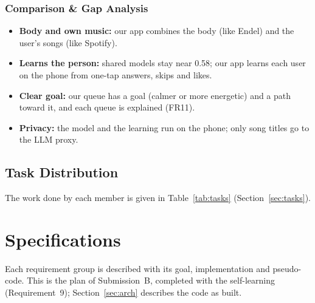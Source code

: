 \documentclass[conference]{IEEEtran}
\begin{document}
\subsubsection{Comparison \& Gap Analysis}
\begin{itemize}
\item \textbf{Body and own music:} our app combines the body (like Endel) and the user's songs (like Spotify).
\item \textbf{Learns the person:} shared models stay near 0.58; our app learns each user on the phone from one-tap answers, skips and likes.
\item \textbf{Clear goal:} our queue has a goal (calmer or more energetic) and a path toward it, and each queue is explained (FR11).
\item \textbf{Privacy:} the model and the learning run on the phone; only song titles go to the LLM proxy.
\end{itemize}

\subsection{Task Distribution}
The work done by each member is given in Table~\ref{tab:tasks} (Section~\ref{sec:tasks}).

\section{Specifications}\label{sec:spec}
Each requirement group is described with its goal, implementation and pseudo-code. This is the plan of Submission~B, completed with the self-learning (Requirement~9); Section~\ref{sec:arch} describes the code as built.
\end{document}
